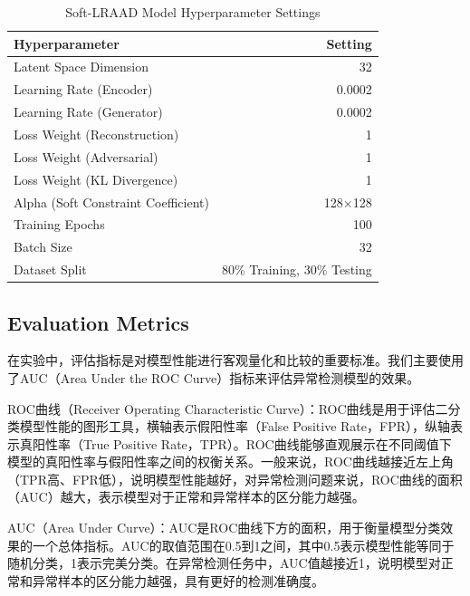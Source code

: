 \documentclass{article}
\begin{document}
\begin{table}[H]
    \centering
    \caption{Soft-LRAAD Model Hyperparameter Settings}
    \label{tab:params}
    \begin{tabular}{lr}
        \toprule
        \textbf{Hyperparameter} & \textbf{Setting} \\
        \midrule
        Latent Space Dimension & 32 \\
        Learning Rate (Encoder) & 0.0002 \\
        Learning Rate (Generator) & 0.0002 \\
        Loss Weight (Reconstruction) & 1 \\
        Loss Weight (Adversarial) & 1 \\
        Loss Weight (KL Divergence) & 1 \\
        Alpha (Soft Constraint Coefficient) & 128$\times $128 \\
        Training Epochs & 100 \\
        Batch Size & 32 \\
        Dataset Split & 80\% Training, 30\% Testing \\
        \bottomrule
    \end{tabular}
\end{table}


\subsection{Evaluation Metrics}
在实验中，评估指标是对模型性能进行客观量化和比较的重要标准。我们主要使用了AUC（Area Under the ROC Curve）指标来评估异常检测模型的效果。

ROC曲线（Receiver Operating Characteristic Curve）：ROC曲线是用于评估二分类模型性能的图形工具，横轴表示假阳性率（False Positive Rate，FPR），纵轴表示真阳性率（True Positive Rate，TPR）。ROC曲线能够直观展示在不同阈值下模型的真阳性率与假阳性率之间的权衡关系。一般来说，ROC曲线越接近左上角（TPR高、FPR低），说明模型性能越好，对异常检测问题来说，ROC曲线的面积（AUC）越大，表示模型对于正常和异常样本的区分能力越强。

AUC（Area Under Curve）：AUC是ROC曲线下方的面积，用于衡量模型分类效果的一个总体指标。AUC的取值范围在0.5到1之间，其中0.5表示模型性能等同于随机分类，1表示完美分类。在异常检测任务中，AUC值越接近1，说明模型对正常和异常样本的区分能力越强，具有更好的检测准确度。
\end{document}
